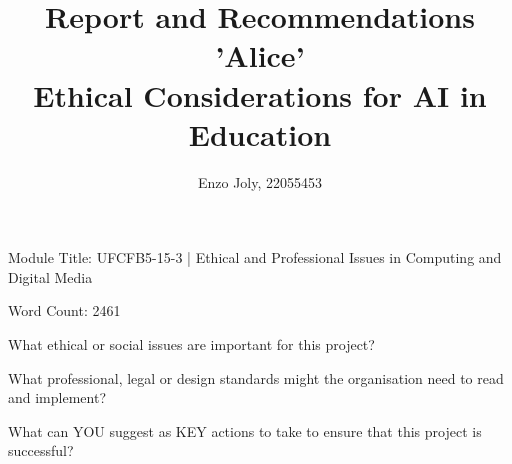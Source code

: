 \documentclass[14pt,a4paper]{article}
\title{Report and Recommendations\\ 'Alice' \\ Ethical Considerations for AI in Education}
\author{Enzo Joly, 22055453}
\date{}
\begin{document}
\maketitle

Module Title: UFCFB5-15-3 | Ethical and Professional Issues in Computing and Digital Media

Word Count: 2461

\hfill

What ethical or social issues are important for this project?

What professional, legal or design standards might the organisation need to read and implement?

What can YOU suggest as KEY actions to take to ensure that this project is successful?

\thispagestyle{empty}

\newpage

\tableofcontents
{}

\newpage

\end{document}
